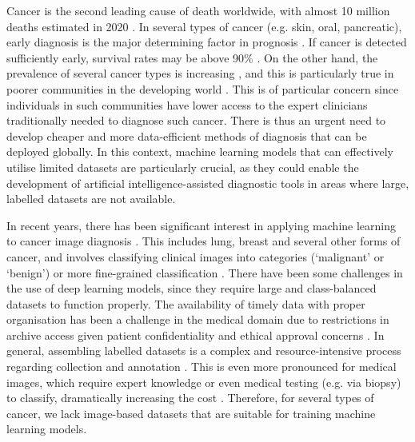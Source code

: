 \documentclass[a4paper,fleqn]{cas-dc}
\begin{document}
Cancer is the second leading cause of death worldwide, with almost 10 million deaths estimated in 2020 \cite{ferlay2021cancer}. In several types of cancer (e.g. skin, oral, pancreatic), early diagnosis is the major determining factor in prognosis \cite{jeschke2012biomarkers,filella2016prostate,kazarian2017testing}. If cancer is detected sufficiently early, survival rates may be above 90\% \cite{rigel2010evolution,kamisawa2016pancreatic,warnakulasuriya2009global}. On the other hand, the prevalence of several cancer types is increasing \cite{warnakulasuriya2009global}, and this is particularly true in poorer communities in the developing world \cite{song2021classification}. This is of particular concern since individuals in such communities have lower access to the expert clinicians traditionally needed to diagnose such cancer. There is thus an urgent need to develop cheaper and more data-efficient methods of diagnosis that can be deployed globally. In this context, machine learning models that can effectively utilise limited datasets are particularly crucial, as they could enable the development of artificial intelligence-assisted diagnostic tools \cite{
kaur2020medical,syed2020artificial,szolovits1988artificial} in areas where large, labelled datasets are not available. 


In recent years, there has been significant interest in applying machine learning to cancer image diagnosis \cite{Litjens2017}. This includes lung, breast and several other forms of cancer, and involves classifying clinical images into categories (`malignant' or `benign') or more fine-grained classification \cite{kwong2021survey,dildar2021skin,Yadav2019}.
There have been some challenges in the use of deep learning models, since they require large and class-balanced datasets to function properly. The availability of timely data with proper organisation has been a challenge in the medical domain due to restrictions in archive access given patient confidentiality and ethical approval concerns \cite{thapa2021precision}.  
In general, assembling labelled datasets is a complex and resource-intensive process regarding collection and annotation \cite{Deng2009}. This is even more pronounced for medical images, which require expert knowledge or even medical testing (e.g. via biopsy) to classify, dramatically increasing the cost \cite{Armato2011,Clark2013}. Therefore, for several types of cancer, we lack image-based datasets that are suitable for training machine learning models.
\end{document}
